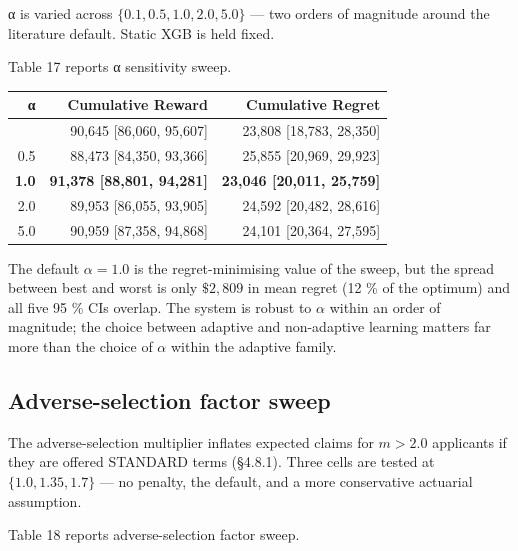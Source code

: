 α is varied across \(\{0.1, 0.5, 1.0, 2.0, 5.0\}\) --- two orders of magnitude around the literature default. Static XGB is held fixed.

Table 17 reports α sensitivity sweep.

\label{tab:5.8.1}

{\def\LTcaptype{none} %
\begin{longtable}[]{@{}rrr@{}}
\toprule\noalign{}
α & Cumulative Reward & Cumulative Regret \\
\midrule\noalign{}
\endhead
\bottomrule\noalign{}
\endlastfoot
0.1 & 90,645 {[}86,060, 95,607{]} & 23,808 {[}18,783, 28,350{]} \\
0.5 & 88,473 {[}84,350, 93,366{]} & 25,855 {[}20,969, 29,923{]} \\
\textbf{1.0} & \textbf{91,378 {[}88,801, 94,281{]}} & \textbf{23,046 {[}20,011, 25,759{]}} \\
2.0 & 89,953 {[}86,055, 93,905{]} & 24,592 {[}20,482, 28,616{]} \\
5.0 & 90,959 {[}87,358, 94,868{]} & 24,101 {[}20,364, 27,595{]} \\
\end{longtable}
}

The default \(\alpha = 1.0\) is the regret-minimising value of the sweep, but the spread between best and worst is only \(\$2{,}809\) in mean regret (12 \% of the optimum) and all five 95 \% CIs overlap. The system is robust to \(\alpha\) within an order of magnitude; the choice between adaptive and non-adaptive learning matters far more than the choice of \(\alpha\) within the adaptive family.

\subsection{Adverse-selection factor sweep}\label{adverse-selection-factor-sweep}

The adverse-selection multiplier inflates expected claims for \(m > 2.0\) applicants if they are offered STANDARD terms (§4.8.1). Three cells are tested at \(\{1.0, 1.35, 1.7\}\) --- no penalty, the default, and a more conservative actuarial assumption.

Table 18 reports adverse-selection factor sweep.

\label{tab:5.8.2}

